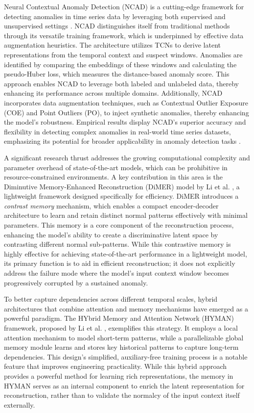 \documentclass[journal]{IEEEtran}
\begin{document}
Neural Contextual Anomaly Detection (NCAD) is a cutting-edge framework for detecting anomalies in time series data by leveraging both supervised and unsupervised settings \cite{carmona2021neural}. NCAD distinguishes itself from traditional methods through its versatile training framework, which is underpinned by effective data augmentation heuristics. The architecture utilizes TCNs \cite{bai2018empirical} to derive latent representations from the temporal context and suspect windows. Anomalies are identified by comparing the embeddings of these windows and calculating the pseudo-Huber loss, which measures the distance-based anomaly score. This approach enables NCAD to leverage both labeled and unlabeled data, thereby enhancing its performance across multiple domains. Additionally, NCAD incorporates data augmentation techniques, such as Contextual Outlier Exposure (COE) and Point Outliers (PO), to inject synthetic anomalies, thereby enhancing the model's robustness. Empirical results display NCAD's superior accuracy and flexibility in detecting complex anomalies in real-world time series datasets, emphasizing its potential for broader applicability in anomaly detection tasks \cite{hendrycks2018deep}.

A significant research thrust addresses the growing computational complexity and parameter overhead of state-of-the-art models, which can be prohibitive in resource-constrained environments. A key contribution in this area is the Diminutive Memory-Enhanced Reconstruction (DiMER) model by Li et al. \cite{li2025contrast}, a lightweight framework designed specifically for efficiency. DiMER introduces a \textit{contrast memory} mechanism, which enables a compact encoder-decoder architecture to learn and retain distinct normal patterns effectively with minimal parameters. This memory is a core component of the reconstruction process, enhancing the model's ability to create a discriminative latent space by contrasting different normal sub-patterns. While this contrastive memory is highly effective for achieving state-of-the-art performance in a lightweight model, its primary function is to aid in efficient reconstruction; it does not explicitly address the failure mode where the model's input context window becomes progressively corrupted by a sustained anomaly.

To better capture dependencies across different temporal scales, hybrid architectures that combine attention and memory mechanisms have emerged as a powerful paradigm. The HYbrid Memory and Attention Network (HYMAN) framework, proposed by Li et al. \cite{li2025hyman}, exemplifies this strategy. It employs a local attention mechanism to model short-term patterns, while a parallelizable global memory module learns and stores key historical patterns to capture long-term dependencies. This design's simplified, auxiliary-free training process is a notable feature that improves engineering practicality. While this hybrid approach provides a powerful method for learning rich representations, the memory in HYMAN serves as an internal component to enrich the latent representation for reconstruction, rather than to validate the normalcy of the input context itself externally.
\end{document}
